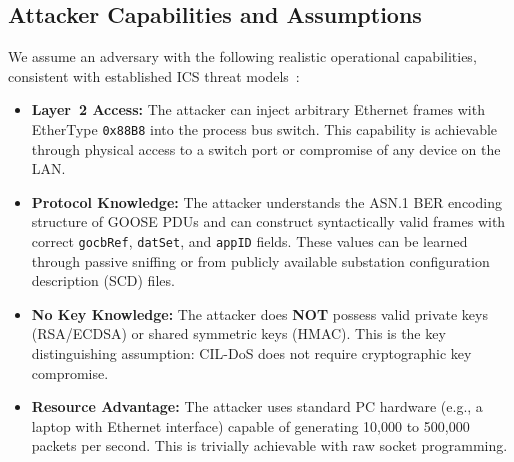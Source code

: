 \documentclass{ieeeaccess}
\begin{document}
\subsection{Attacker Capabilities and Assumptions}
We assume an adversary with the following realistic operational capabilities, consistent with established ICS threat models~\cite{khan2021survey, prevelakis2018ics}:
\begin{itemize}[leftmargin=*]
    \item \textbf{Layer~2 Access:} The attacker can inject arbitrary Ethernet frames with EtherType \texttt{0x88B8} into the process bus switch. This capability is achievable through physical access to a switch port or compromise of any device on the LAN.
    \item \textbf{Protocol Knowledge:} The attacker understands the ASN.1 BER encoding structure of GOOSE PDUs and can construct syntactically valid frames with correct \texttt{gocbRef}, \texttt{datSet}, and \texttt{appID} fields. These values can be learned through passive sniffing or from publicly available substation configuration description (SCD) files.
    \item \textbf{No Key Knowledge:} The attacker does \textbf{NOT} possess valid private keys (RSA/ECDSA) or shared symmetric keys (HMAC). This is the key distinguishing assumption: CIL-DoS does not require cryptographic key compromise.
    \item \textbf{Resource Advantage:} The attacker uses standard PC hardware (e.g., a laptop with Ethernet interface) capable of generating 10,000 to 500,000 packets per second. This is trivially achievable with raw socket programming.
\end{itemize}
\end{document}
